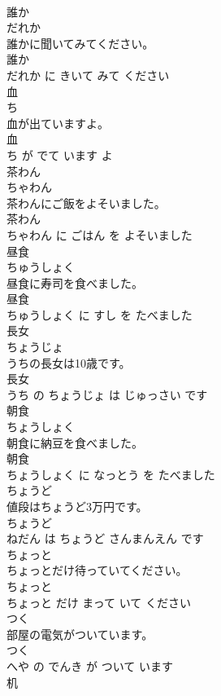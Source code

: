 \documentclass[8pt]{extreport}
\begin{document}
\begin{CJK}{UTF8}{min}
\\	誰か	
\\	だれか			
\\	誰かに聞いてみてください。	
\\	誰か 
\\	だれか に きいて みて ください			
\\	血	
\\	ち			
\\	血が出ていますよ。	
\\	血 
\\	ち が でて います よ			
\\	茶わん	
\\	ちゃわん			
\\	茶わんにご飯をよそいました。	
\\	茶わん 
\\	ちゃわん に ごはん を よそいました			
\\	昼食	
\\	ちゅうしょく			
\\	昼食に寿司を食べました。	
\\	昼食 
\\	ちゅうしょく に すし を たべました			
\\	長女	
\\	ちょうじょ			
\\	うちの長女は10歳です。	
\\	長女 
\\	うち の ちょうじょ は じゅっさい です			
\\	朝食	
\\	ちょうしょく			
\\	朝食に納豆を食べました。	
\\	朝食 
\\	ちょうしょく に なっとう を たべました			
\\	ちょうど	
\\	値段はちょうど3万円です。	
\\	ちょうど 
\\	ねだん は ちょうど さんまんえん です			
\\	ちょっと	
\\	ちょっとだけ待っていてください。	
\\	ちょっと 
\\	ちょっと だけ まって いて ください			
\\	つく	
\\	部屋の電気がついています。	
\\	つく 
\\	へや の でんき が ついて います			
\\	机	

\end{CJK}
\end{document}

